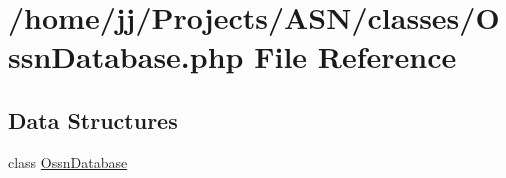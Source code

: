\hypertarget{_ossn_database_8php}{}\section{/home/jj/\+Projects/\+A\+S\+N/classes/\+Ossn\+Database.php File Reference}
\label{_ossn_database_8php}
\subsection*{Data Structures}
\begin{DoxyCompactItemize}
\item 
class \hyperlink{class_ossn_database}{Ossn\+Database}
\end{DoxyCompactItemize}
